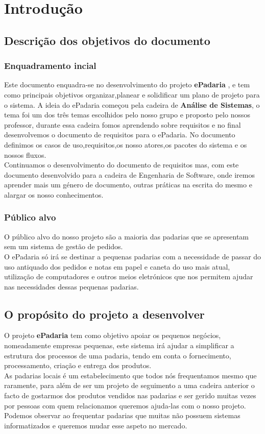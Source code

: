 \chapter{Introdução}
\label{introdução}
\section{Descrição dos objetivos do documento}
\subsection{Enquadramento incial}
Este documento enquadra-se no desenvolvimento do projeto \textbf{ePadaria} , e tem como principais objetivos organizar,planear e solidificar um plano de projeto para o sistema.
A ideia do ePadaria começou pela cadeira de \textbf{Análise de Sistemas}, o tema foi um dos três temas escolhidos pelo nosso grupo e proposto pelo nossos professor, durante essa cadeira fomos aprendendo sobre requisitos e no final desenvolvemos o documento de requisitos para o ePadaria. No documento definimos os casos de uso,requisitos,os nosso atores,os pacotes do sistema e os nossos fluxos.\\
Continuamos o desenvolvimento do documento de requisitos mas, com este documento desenvolvido para a cadeira de Engenharia de Software, onde iremos aprender mais um género de documento, outras práticas na escrita do mesmo e alargar os nosso conhecimentos.

\subsection{Público alvo}
O público alvo do nosso projeto são a maioria das padarias que se apresentam sem um sistema de gestão de pedidos.\\
O ePadaria só irá se destinar a pequenas padarias com a necessidade de passar do uso antiquado dos pedidos e notas em papel e caneta do uso mais atual, utilização de computadores e outros meios eletrónicos que nos permitem ajudar nas necessidades dessas pequenas padarias.

\section{O propósito do projeto a desenvolver}
O projeto \textbf{ePadaria} tem como objetivo apoiar os pequenos negócios, nomeadamente empresas pequenas, este sistema irá ajudar a simplificar a estrutura dos processos de uma padaria, tendo em conta o fornecimento, processamento, criação e entrega dos produtos.\\
As padarias locais é um estabelecimento que todos nós frequentamos mesmo que raramente, para além de ser um projeto de seguimento a uma cadeira anterior o facto de gostarmos dos produtos vendidos nas padarias e ser gerido muitas vezes por pessoas com quem relacionamos queremos ajuda-las com o nosso projeto. Podemos observar ao frequentar padarias que muitas não possuem sistemas informatizados e queremos mudar esse aspeto no mercado.
\\
